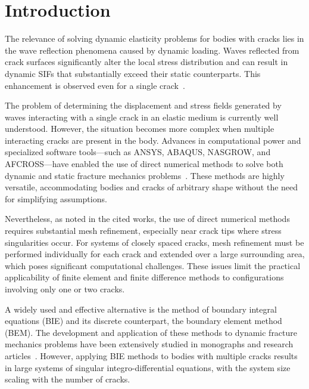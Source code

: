 

\section{Introduction}

The relevance of solving dynamic elasticity problems for bodies with cracks lies in the wave reflection phenomena caused by dynamic loading. Waves reflected from crack surfaces significantly alter the local stress distribution and can result in dynamic SIFs that substantially exceed their static counterparts. This enhancement is observed even for a single crack~\cite{Popov13, Popov21, Popov27, Popov28, Popov31}.

The problem of determining the displacement and stress fields generated by waves interacting with a single crack in an elastic medium is currently well understood. However, the situation becomes more complex when multiple interacting cracks are present in the body. Advances in computational power and specialized software tools—such as ANSYS, ABAQUS, NASGROW, and AFCROSS—have enabled the use of direct numerical methods to solve both dynamic and static fracture mechanics problems~\cite{Popov2, Popov7, Popov8, Popov26}. These methods are highly versatile, accommodating bodies and cracks of arbitrary shape without the need for simplifying assumptions.

Nevertheless, as noted in the cited works, the use of direct numerical methods requires substantial mesh refinement, especially near crack tips where stress singularities occur. For systems of closely spaced cracks, mesh refinement must be performed individually for each crack and extended over a large surrounding area, which poses significant computational challenges. These issues limit the practical applicability of finite element and finite difference methods to configurations involving only one or two cracks.

A widely used and effective alternative is the method of boundary integral equations (BIE) and its discrete counterpart, the boundary element method (BEM). The development and application of these methods to dynamic fracture mechanics problems have been extensively studied in monographs and research articles~\cite{Popov28, Popov31, Popov3, Popov5, Popov6, Popov9, Popov11, Popov12, Popov22, Popov25, Popov29}. However, applying BIE methods to bodies with multiple cracks results in large systems of singular integro-differential equations, with the system size scaling with the number of cracks.

